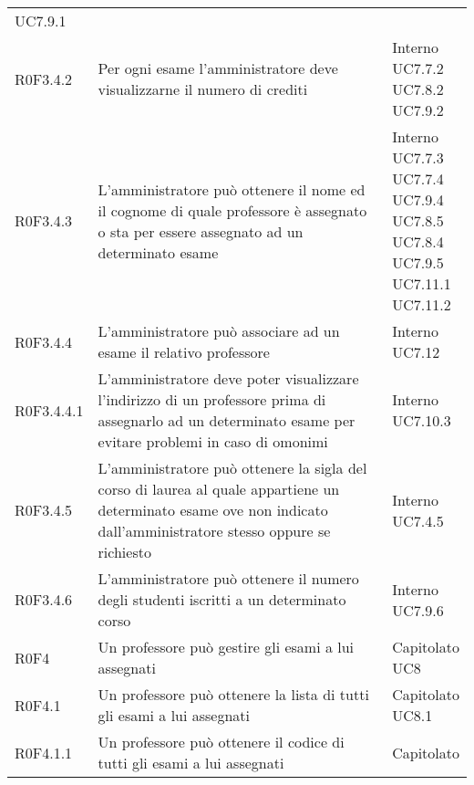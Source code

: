\documentclass[AnalisiDeiRequisiti.tex]{subfiles}
\begin{document}
\begin{longtable}[H]{p{2cm}p{5.2cm}p{5cm}}
{		UC7.9.1
	} \\
	R0F3.4.2 & Per ogni esame l'amministratore deve visualizzarne il numero di crediti & \makecell[tl]{
		Interno \\
		UC7.7.2 \\
		UC7.8.2 \\
		UC7.9.2
	} \\
	R0F3.4.3 & L'amministratore può ottenere il nome ed il cognome di quale professore è assegnato o sta per essere assegnato ad un determinato esame & \makecell[tl]{
		Interno \\ 
		UC7.7.3 \\
		UC7.7.4 \\
		UC7.9.4 \\
		UC7.8.5 \\
		UC7.8.4 \\
		UC7.9.5 \\
		UC7.11.1 \\
		UC7.11.2
	} \\
	R0F3.4.4  & L'amministratore può associare ad un esame il relativo professore & \makecell[tl]{
		Interno	 \\
		UC7.12 	
	} \\
	R0F3.4.4.1 & L'amministratore deve poter visualizzare l'indirizzo di un professore prima di assegnarlo ad un determinato esame per evitare problemi in caso di omonimi & \makecell[tl]{
		Interno	 \\ 
		UC7.10.3 \\
	} \\
	R0F3.4.5 & L'amministratore può ottenere la sigla del corso di laurea al quale appartiene un determinato esame ove non indicato dall'amministratore stesso oppure se richiesto & \makecell[tl]{
		Interno	 \\ 
		UC7.4.5
	} \\
	R0F3.4.6 & L'amministratore può ottenere il numero degli studenti iscritti a un determinato corso  & \makecell[tl]{
		Interno	 \\ 
		UC7.9.6
	} \\
	R0F4 & Un professore può gestire gli esami a lui assegnati & \makecell[tl]{
		Capitolato \\ 
		UC8
	} \\
	R0F4.1 & Un professore può ottenere la lista di tutti gli esami a lui assegnati & \makecell[tl]{
		Capitolato \\ 
		UC8.1
	} \\
	R0F4.1.1 & Un professore può ottenere il codice di tutti gli esami a lui assegnati & \makecell[tl]{
		Capitolato \\ 
}
\end{longtable}
\end{document}
